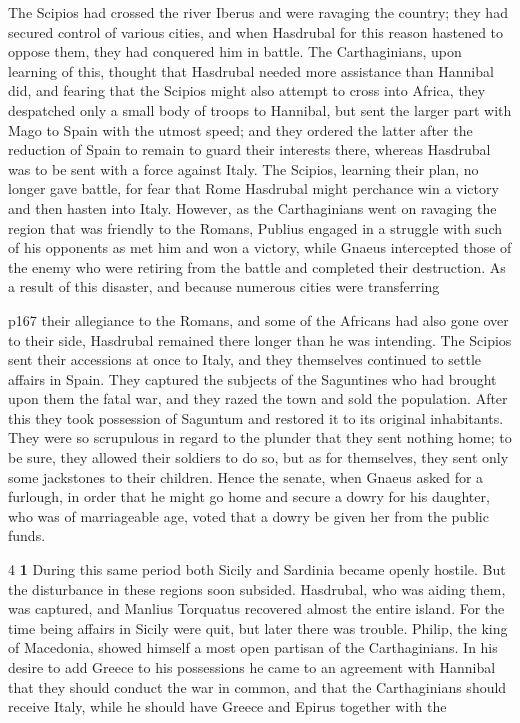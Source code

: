 The Scipios had crossed the river Iberus and were ravaging the country; they had secured control of various cities, and when Hasdrubal for this reason hastened to oppose them, they had conquered him in battle. The Carthaginians, upon learning of this, thought that Hasdrubal needed more assistance than Hannibal did, and fearing that the Scipios might also attempt to cross into Africa, they despatched only a small body of troops to Hannibal, but sent the larger part with Mago to Spain with the utmost speed; and they ordered the latter after the reduction of Spain to remain to guard their interests there, whereas Hasdrubal was to be sent with a force against Italy. The Scipios, learning their plan, no longer gave battle, for fear that Rome Hasdrubal might perchance win a victory and then hasten into Italy. However, as the Carthaginians went on ravaging the region that was friendly to the Romans, Publius engaged in a struggle with such of his opponents as met him and won a victory, while Gnaeus intercepted those of the enemy who were retiring from the battle and completed their destruction. As a result of this disaster, and because numerous cities were transferring

p167 their allegiance to the Romans, and some of the Africans had also gone over to their side, Hasdrubal remained there longer than he was intending. The Scipios sent their accessions at once to Italy, and they themselves continued to settle affairs in Spain. They captured the subjects of the Saguntines who had brought upon them the fatal war, and they razed the town and sold the population. After this they took possession of Saguntum and restored it to its original inhabitants. They were so scrupulous in regard to the plunder that they sent nothing home; to be sure, they allowed their soldiers to do so, but as for themselves, they sent only some jackstones to their children. Hence the senate, when Gnaeus asked for a furlough, in order that he might go home and secure a dowry for his daughter, who was of marriageable age, voted that a dowry be given her from the public funds.

4 \textbf{1} During this same period both Sicily and Sardinia became openly hostile. But the disturbance in these regions soon subsided. Hasdrubal, who was aiding them, was captured, and Manlius Torquatus recovered almost the entire island. For the time being affairs in Sicily were quit, but later there was trouble. Philip, the king of Macedonia, showed himself a most open partisan of the Carthaginians. In his desire to add Greece to his possessions he came to an agreement with Hannibal that they should conduct the war in common, and that the Carthaginians should receive Italy, while he should have Greece and Epirus together with the

